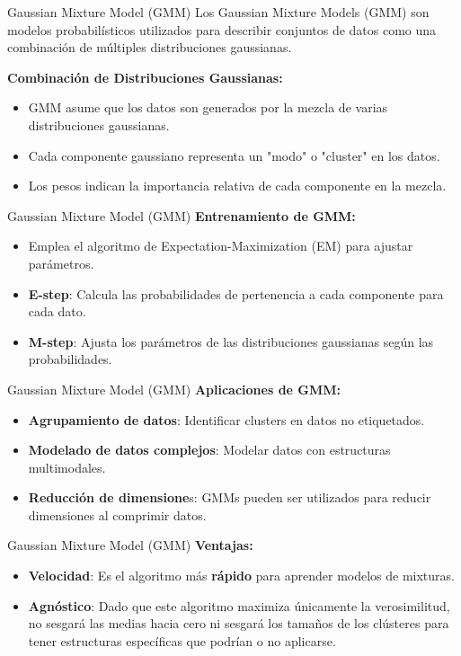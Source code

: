\begin{frame}{Gaussian Mixture Model (GMM)}
Los Gaussian Mixture Models (GMM) son modelos probabilísticos utilizados para describir conjuntos de datos como una combinación de múltiples distribuciones gaussianas.

\textbf{Combinación de Distribuciones Gaussianas:}
\begin{itemize}
    \item GMM asume que los datos son generados por la mezcla de varias distribuciones gaussianas.
    \item Cada componente gaussiano representa un "modo" o "cluster" en los datos.
    \item Los pesos indican la importancia relativa de cada componente en la mezcla.
\end{itemize}
\end{frame}


\begin{frame}{Gaussian Mixture Model (GMM)}
\textbf{Entrenamiento de GMM:}
\begin{itemize}
    \item Emplea el algoritmo de Expectation-Maximization (EM) para ajustar parámetros.
    \item \textbf{E-step}: Calcula las probabilidades de pertenencia a cada componente para cada dato.
    \item \textbf{M-step}: Ajusta los parámetros de las distribuciones gaussianas según las probabilidades.
\end{itemize}
\end{frame}


\begin{frame}{Gaussian Mixture Model (GMM)}
\textbf{Aplicaciones de GMM:}
\begin{itemize}
    \item \textbf{Agrupamiento de datos}: Identificar clusters en datos no etiquetados.
    \item \textbf{Modelado de datos complejos}: Modelar datos con estructuras multimodales.
    \item \textbf{Reducción de dimensione}s: GMMs pueden ser utilizados para reducir dimensiones al comprimir datos.
\end{itemize}
\end{frame}


\begin{frame}{Gaussian Mixture Model (GMM)}
\textbf{Ventajas:}
\begin{itemize}
    \item \textbf{Velocidad}: Es el algoritmo más \textbf{rápido} para aprender modelos de mixturas.
    \item \textbf{Agnóstico}: Dado que este algoritmo maximiza únicamente la verosimilitud, no sesgará las medias hacia cero ni sesgará los tamaños de los clústeres para tener estructuras específicas que podrían o no aplicarse.

\end{itemize}



\end{frame}




